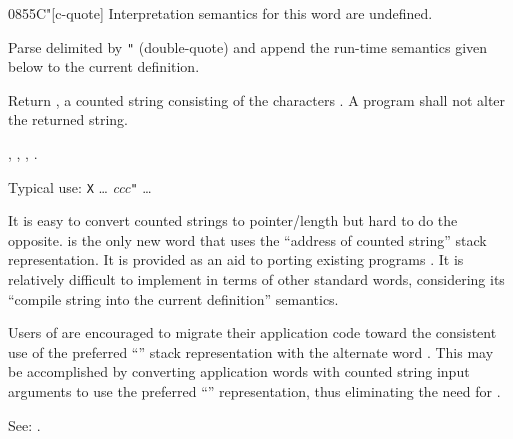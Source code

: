 \begin{worddef}[Cq]{0855}{C"}[c-quote]
\interpret
	Interpretation semantics for this word are undefined.

\compile

	Parse  delimited by \texttt{"} (double-quote) and
	append the run-time semantics given below to the current
	definition.

\runtime

	Return , a counted string consisting of the
	characters . A program shall not alter the returned
	string.

\see {},
	,
	,
	.

	\begin{rationale} %
		Typical use:
			\word{:} \texttt{X} {\ldots}
				 \emph{ccc}\texttt{"}
			{\ldots} \word{;}

		It is easy to convert counted strings to pointer/length but
		hard to do the opposite.  is the only new word that
		uses the ``address of counted string'' stack representation.
		It is provided as an aid to porting existing programs%
		.
		It is relatively difficult to implement 
		in terms of other standard words, considering its ``compile
		string into the current definition'' semantics.

		Users of  are encouraged to migrate their application
		code toward the consistent use of the preferred
		``'' stack representation with the alternate
		word . This may be accomplished by converting
		application words with counted string input arguments to use
		the preferred ``'' representation, thus
		eliminating the need for .

		See: .
	\end{rationale}

	\begin{testing}
		 \\
		 \\
		 \\
	\end{testing}
\end{worddef}


